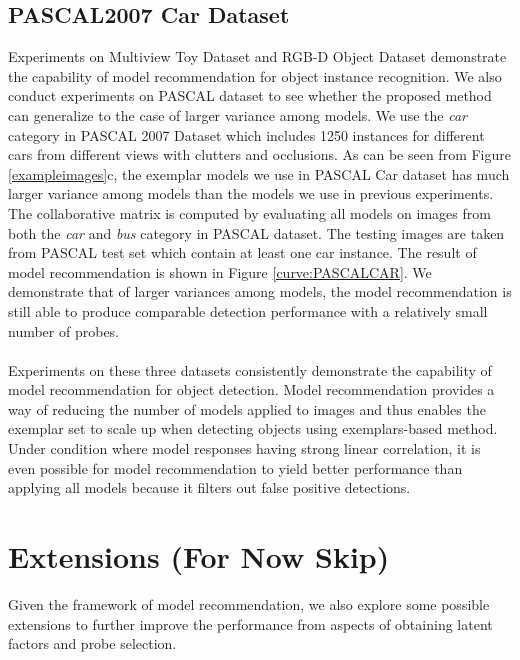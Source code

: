 \documentclass{article} %
\begin{document}
\subsection{PASCAL2007 Car Dataset}
Experiments on Multiview Toy Dataset and RGB-D Object Dataset demonstrate the capability of model recommendation for object instance recognition. We also conduct experiments on PASCAL dataset to see whether the proposed method can generalize to the case of larger variance among models. We use the \emph{car} category in PASCAL 2007 Dataset which includes 1250 instances for different cars from different views with clutters and occlusions. As can be seen from Figure \ref{exampleimages}c, the exemplar models we use in PASCAL Car dataset has much larger variance among models than the models we use in previous experiments. The collaborative matrix is computed by evaluating all models on images from both the \emph{car} and \emph{bus} category in PASCAL dataset. The testing images are taken from PASCAL test set which contain at least one car instance. The result of model recommendation is shown in Figure \ref{curve:PASCALCAR}. We demonstrate that of larger variances among models, the model recommendation is still able to produce comparable detection performance with a relatively small number of probes. \\\\
Experiments on these three datasets consistently demonstrate the capability of model recommendation for object detection. Model recommendation provides a way of reducing the number of models applied to images and thus enables the exemplar set to scale up when detecting objects using exemplars-based method. Under condition where model responses having strong linear correlation, it is even possible for model recommendation to yield better performance than applying all models because it filters out false positive detections.

\section{Extensions (For Now Skip)}
Given the framework of model recommendation, we also explore some possible extensions to further improve the performance from aspects of obtaining latent factors and probe selection.
\end{document}

